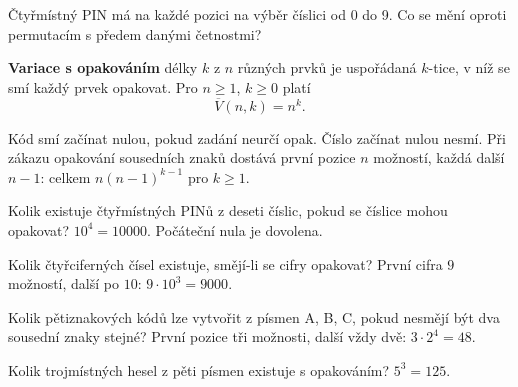 \documentclass[11pt,a4paper]{article}
\begin{document}

Čtyřmístný PIN má na každé pozici na výběr číslici od 0 do 9. Co se mění oproti permutacím s předem danými četnostmi?



\begin{definiceBox}
\textbf{Variace s opakováním} délky $k$ z $n$ různých prvků je uspořádaná $k$-tice, v níž se smí každý prvek opakovat. Pro $n\ge1$, $k\ge0$ platí
\[
\overline{V}(n,k)=n^k.
\]
\end{definiceBox}
Kód smí začínat nulou, pokud zadání neurčí opak. Číslo začínat nulou nesmí. Při zákazu opakování sousedních znaků dostává první pozice $n$ možností, každá další $n-1$: celkem $n(n-1)^{k-1}$ pro $k\ge1$.


\begin{prikladReseniBox}[title={Příklad 1}]
Kolik existuje čtyřmístných PINů z deseti číslic, pokud se číslice mohou opakovat?
\tcblower
$10^4=10000$. Počáteční nula je dovolena.
\end{prikladReseniBox}



\begin{prikladReseniBox}[title={Příklad 2}]
Kolik čtyřciferných čísel existuje, smějí-li se cifry opakovat?
\tcblower
První cifra $9$ možností, další po $10$: $9\cdot10^3=9000$.
\end{prikladReseniBox}



\begin{prikladReseniBox}[title={Příklad 3}]
Kolik pětiznakových kódů lze vytvořit z písmen A, B, C, pokud nesmějí být dva sousední znaky stejné?
\tcblower
První pozice tři možnosti, další vždy dvě: $3\cdot2^4=48$.
\end{prikladReseniBox}




\begin{zadaniReseniBox}[title={Samostatná práce 1}]
Kolik trojmístných hesel z pěti písmen existuje s opakováním?
\tcblower
$5^3=125$.
\end{zadaniReseniBox}
\end{document}
